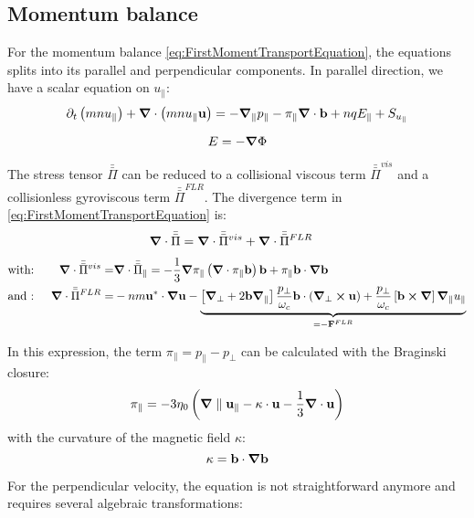 \subsection{Momentum balance}
For the momentum balance \ref{eq:FirstMomentTransportEquation}, the equations splits into its parallel and perpendicular components. In parallel direction, we have a scalar equation on $u_\parallel$:
\begin{equation}
	\partial_t \left(mnu_\parallel\right) + \grad\cdot\left(mnu_\parallel\mathbf{u}\right) = -\grad_\parallel{p_\parallel} - \pi_\parallel\grad\cdot\mathbf{b} + nqE_\parallel + S_{u_\parallel}
\end{equation}

$$ E = -\grad{\Phi}$$

The stress tensor $\bar{\bar{\Pi}}$ can be reduced to a collisional viscous term $\bar{\bar{\Pi}}^{vis}$ and a collisionless gyroviscous term $\bar{\bar{\Pi}}^{FLR}$. The divergence term in \autoref{eq:FirstMomentTransportEquation} is:  
\begin{align}
	\grad\cdot\bar{\bar{\Pi}} &= \grad\cdot\bar{\bar{\Pi}}^{vis} + \grad\cdot\bar{\bar{\Pi}}^{FLR} 
\end{align}
\begin{align}
	&\text{with: }&\grad\cdot\bar{\bar{\Pi}}^{vis} =& \grad\cdot\bar{\bar{\Pi}}_\parallel = -\frac{1}{3}\grad\pi_\parallel\left(\grad\cdot\pi_\parallel\mathbf{b}\right)\mathbf{b} + \pi_\parallel\mathbf{b}\cdot\grad\mathbf{b} \nonumber\\
	&\text{and : }&\grad\cdot\bar{\bar{\Pi}}^{FLR} =& -nm\mathbf{u}^*\cdot\grad\mathbf{u} - \underbrace{\left[\grad_\perp + 2\mathbf{b}\grad_\parallel\right]\frac{p_\perp}{\omega_c}\mathbf{b}\cdot(\grad_\perp\cross\mathbf{u})+\frac{p_\perp}{\omega_c}\left[\mathbf{b}\cross\grad\right]\grad_\parallel u_\parallel}_{=-\mathbf{F}^{FLR}} \nonumber	
\end{align}

In this expression, the term $\pi_\parallel = p_\parallel - p_\perp$ can be calculated with the Braginski closure:
\begin{equation}
	\pi_\parallel = -3\eta_0\left(\grad\parallel\mathbf{u}_\parallel-\kappa\cdot\mathbf{u}-\frac{1}{3}\grad\cdot\mathbf{u}\right)
\end{equation}
with the curvature of the magnetic field $\kappa$: $$ \kappa = \mathbf{b}\cdot\grad\mathbf{b}$$



For the perpendicular velocity, the equation is not straightforward anymore and requires several algebraic transformations:

